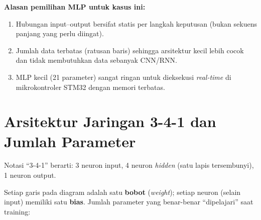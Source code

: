 \documentclass[11pt,a4paper]{article}
\begin{document}
\textbf{Alasan pemilihan MLP untuk kasus ini:}
\begin{enumerate}[nosep]
  \item Hubungan input--output bersifat statis per langkah keputusan (bukan sekuens panjang
  yang perlu diingat).
  \item Jumlah data terbatas (ratusan baris) sehingga arsitektur kecil lebih cocok dan
  tidak membutuhkan data sebanyak CNN/RNN.
  \item MLP kecil (21 parameter) sangat ringan untuk dieksekusi \emph{real-time} di
  mikrokontroler STM32 dengan memori terbatas.
\end{enumerate}

\section{Arsitektur Jaringan 3-4-1 dan Jumlah Parameter}

Notasi ``3-4-1'' berarti: 3 neuron input, 4 neuron \emph{hidden} (satu lapis
tersembunyi), 1 neuron output.

\begin{center}
\end{center}

Setiap garis pada diagram adalah satu \textbf{bobot} (\emph{weight}); setiap neuron
(selain input) memiliki satu \textbf{bias}. Jumlah parameter yang benar-benar
``dipelajari'' saat training:
\end{document}
